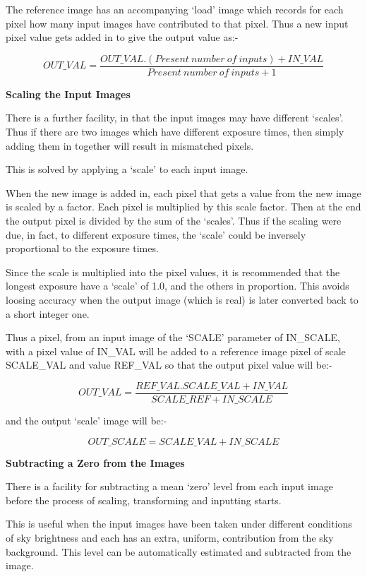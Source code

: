 \begin{small}
{{ The reference image has an accompanying `load' image which records for
 each pixel how many input images have contributed to that pixel. Thus
 a new input pixel value gets added in to give the output value as:-


$$    OUT\_VAL =  \frac{OUT\_VAL.(Present~number~of~inputs) + IN\_VAL}{
                     Present~number~of~inputs + 1} $$


{\hspace*{4ex} \bf Scaling the Input Images}

 There is a further facility, in that the input images may have
 different `scales'. Thus if there are two images which have different
 exposure times, then simply adding them in together will result in
 mismatched pixels.

 This is solved by applying a `scale' to each input image.

 When the new image is added in, each pixel that gets a value from the
 new image is scaled by a factor. Each pixel is multiplied by this
 scale factor. Then at the end the output pixel is divided by the sum
 of the `scales'. Thus if the scaling were due, in fact, to different
 exposure times, the `scale' could be inversely proportional to the
 exposure times.

 Since the scale is multiplied into the pixel values, it is recommended
 that the longest exposure have a `scale' of 1.0, and the others in
 proportion. This avoids loosing accuracy when the output image (which
 is real) is later converted back to a short integer one.

 Thus a pixel, from an input image of the `SCALE' parameter of IN\_SCALE,
 with a pixel value of IN\_VAL will be added to a reference image pixel
 of scale SCALE\_VAL and value REF\_VAL so that the output pixel value
 will be:-

 $$ OUT\_VAL = \frac{REF\_VAL.SCALE\_VAL + IN\_VAL}{SCALE\_REF + IN\_SCALE}$$

 and the output `scale' image will be:-

 $$ OUT\_SCALE = SCALE\_VAL + IN\_SCALE $$


{\hspace*{4ex} \bf Subtracting a Zero from the Images}

 There is a facility for subtracting a mean `zero' level from each input
 image before the process of scaling, transforming and inputting starts.

 This is useful when the input images have been taken under different
 conditions of sky brightness and each has an extra, uniform,
 contribution from the sky background. This level can be automatically
 estimated and subtracted from the image.

}}
\end{small}
